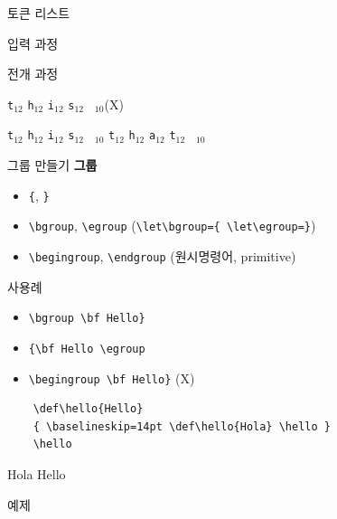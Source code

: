\documentclass{beamer}
\begin{document}
%
\begin{frame}[fragile]{토큰 리스트}
\begin{verbatim*}
\def\tokentwo{\iftrue this \else that \fi}
\def\tokenone#1{...}
\expandafter\tokenone\tokentwo
\end{verbatim*}
    \bigskip

    \alert{입력 과정}
    
    \quad
    \quad
    
    \bigskip
    \alert{전개 과정}

    \quad
    \verb|t|$_{12}$\quad
    \verb|h|$_{12}$\quad
    \verb|i|$_{12}$\quad
    \verb|s|$_{12}$\quad
    \verb*| |$_{10}$\quad (X)

    \bigskip
    \quad
    \quad
    \verb|t|$_{12}$\quad
    \verb|h|$_{12}$\quad
    \verb|i|$_{12}$\quad
    \verb|s|$_{12}$\quad
    \verb*| |$_{10}$\quad
    \quad
    \verb|t|$_{12}$\quad
    \verb|h|$_{12}$\quad
    \verb|a|$_{12}$\quad
    \verb|t|$_{12}$\quad
    \verb*| |$_{10}$\quad
\end{frame}


%
\begin{frame}[fragile]{그룹 만들기}
  \textbf{\alert{그룹}}
  \begin{itemize}
  \item \verb+{+, \verb+}+
  \item \verb+\bgroup+, \verb+\egroup+
    ({\small \verb+\let\bgroup={ \let\egroup=}+})
  \item \verb+\begingroup+, \verb+\endgroup+ (원시명령어, primitive)
  \end{itemize}
  \alert{사용례}
  \begin{itemize}
  \item \verb+\bgroup \bf Hello}+
  \item \verb+{\bf Hello \egroup+
  \item \verb+\begingroup \bf Hello}+ (X)
  \end{itemize}
  {\small
\begin{verbatim}
    \def\hello{Hello}
    { \baselineskip=14pt \def\hello{Hola} \hello }
    \hello
\end{verbatim}}
  Hola Hello
\end{frame}


%
\begin{frame}[standout]
  예제
\end{frame}
\end{document}
